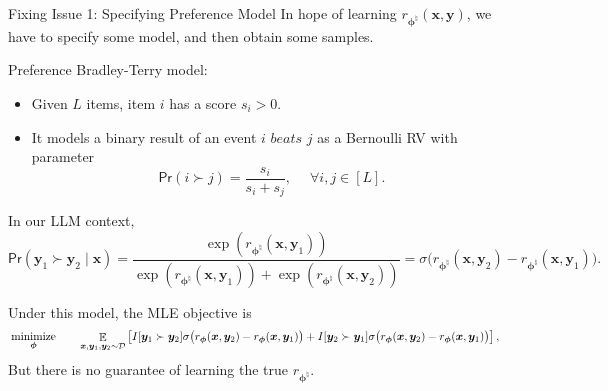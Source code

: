 \documentclass[10pt,xcolor={usenames,dvipsnames,table},aspectratio=169]{beamer}
\begin{document}
\begin{frame}{Fixing Issue 1: Specifying Preference Model}
In hope of learning $r_{\boldsymbol \phi^{\natural}}(\bm{x}, \bm{y})$, we have to specify some model, and then obtain some samples.

Preference Bradley-Terry model: 
\begin{itemize}
    \item Given $L$ items, item $i$ has a score $s_i > 0$.
    \item It models a binary result of an event $i \textit{ beats } j$ as a Bernoulli RV with parameter
\[
\textsf{Pr}( i \succ j) = \dfrac{s_i}{s_i + s_j}, \quad \; \forall i, j \in [L].
\] 
\end{itemize}
In our LLM context, 
\[
\textsf{Pr}(\bm{y}_1 \succ \bm{y}_2 \mid \bm{x}) = \dfrac{\exp(r_{\boldsymbol\phi^{\natural }}(\bm{x}, \bm{y}_1))}{\exp(r_{\boldsymbol \phi^{\natural }}(\bm{x}, \bm{y}_1)) + \exp(r_{\boldsymbol \phi^{\natural }}(\bm{x}, \bm{y}_2))}
= \sigma \big( r_{\boldsymbol \phi^{\natural}}(\bm{x}, \bm{y}_2)- r_{\boldsymbol \phi^{\natural}}(\bm{x}, \bm{y}_1)\big)
.
\] 

Under this model, the MLE objective is \citep{ziegler2019fine}
\begin{alignat*}{2}
    & \operatorname*{minimize}_{\boldsymbol \phi} \quad && \mathop{\mathbb{E}}_{\bm{x}, \bm{y}_1, \bm{y}_2 \sim \mathcal{D}} \left[ I[\bm{y}_1 \succ \bm{y}_2] \sigma \big(r_{\boldsymbol \phi}(\bm{x}, \bm{y}_2) - r_{\boldsymbol \phi}(\bm{x}, \bm{y}_1)\big) + I[\bm{y}_2 \succ \bm{y}_1] \sigma\big(r_{\boldsymbol \phi}(\bm{x}, \bm{y}_2) - r_{\boldsymbol \phi}(\bm{x}, \bm{y}_1)\big) \right],
\end{alignat*}
But there is no guarantee of learning the true $r_{\boldsymbol \phi^{\natural}}$.
\end{frame}
\end{document}
